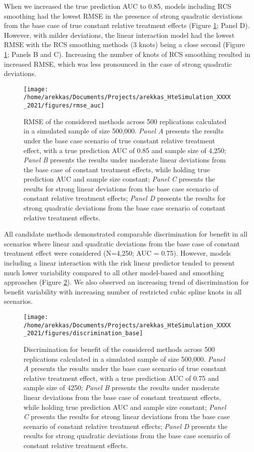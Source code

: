 \documentclass{article}
\begin{document}
When we increased the true prediction AUC to 0.85, models including RCS
smoothing had the lowest RMSE in the presence of strong quadratic
deviations from the base case of true constant relative treatment
effects (Figure \ref{fig:rmseauc}; Panel D). However, with milder
deviations, the linear interaction model had the lowest RMSE with the
RCS smoothing methods (3 knots) being a close second (Figure
\ref{fig:rmseauc}; Panels B and C). Increasing the number of knots of
RCS smoothing resulted in increased RMSE, which was less pronounced in
the case of strong quadratic deviations.

\begin{figure}
\texttt{[image: /home/arekkas/Documents/Projects/arekkas\_HteSimulation\_XXXX\_2021/figures/rmse\_auc]} \caption{RMSE of the considered methods across 500 replications calculated in a simulated sample of size 500,000. \textit{Panel A} presents the results under the base case scenario of true constant relative treatment effect, with a true prediction AUC of 0.85 and sample size of 4,250; \textit{Panel B} presents the results under moderate linear deviations from the base case of constant treatment effects, while holding true prediction AUC and sample size constant; \textit{Panel C} presents the results for strong linear deviations from the base case scenario of constant relative treatment effects; \textit{Panel D} presents the results for strong quadratic deviations from the base case scenario of constant relative treatment effects.}\label{fig:rmseauc}
\end{figure}

All candidate methods demonstrated comparable discrimination for benefit
in all scenarios where linear and quadratic deviations from the base
case of constant treatment effect were considered (N=4,250; AUC = 0.75).
However, models including a linear interaction with the risk linear
predictor tended to present much lower variability compared to all other
model-based and smoothing approaches (Figure \ref{fig:discrimination}).
We also observed an increasing trend of discrimination for benefit
variability with increasing number of restricted cubic spline knots in
all scenarios.

\begin{figure}
\texttt{[image: /home/arekkas/Documents/Projects/arekkas\_HteSimulation\_XXXX\_2021/figures/discrimination\_base]} \caption{Discrimination for benefit of the considered methods across 500 replications calculated in a simulated sample of size 500,000. \textit{Panel A} presents the results under the base case scenario of true constant relative treatment effect, with a true prediction AUC of 0.75 and sample size of 4250; \textit{Panel B} presents the results under moderate linear deviations from the base case of constant treatment effects, while holding true prediction AUC and sample size constant; \textit{Panel C} presents the results for strong linear deviations from the base case scenario of constant relative treatment effects; \textit{Panel D} presents the results for strong quadratic deviations from the base case scenario of constant relative treatment effects.}\label{fig:discrimination}
\end{figure}
\end{document}
